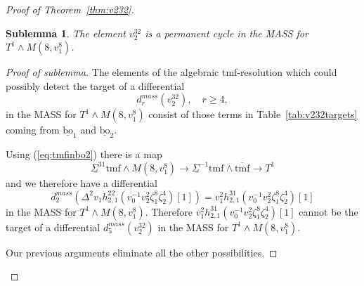 \documentclass[10pt]{amsart}
\newcommand{\ul}[1]{\underline{#1}}
\newcommand{\br}[1]{\overline{#1}}
\newcommand{\tmf}{\mathrm{tmf}}
\newcommand{\bo}{\mathrm{bo}}
\newcommand{\bou}{\ul{\bo}}
\newtheorem{sublem}[equation]{Sublemma}
\theoremstyle{definition}
\numberwithin{equation}{section}
\numberwithin{figure}{section}
\begin{document}
\begin{proof}[Proof of Theorem~\ref{thm:v232}]
\begin{description}
\begin{sublem}\label{sublem:v232T1}
The element $v_2^{32}$ is a permanent cycle in the MASS for $T^1 \wedge M(8,v_1^8)$.
\end{sublem}

\begin{proof}[Proof of sublemma]
The elements of the algebraic tmf-resolution which could possibly detect the target of a differential 
$$ d_r^{mass}(v_2^{32}), \quad r \ge 4, $$
in the MASS for $T^1 \wedge M(8,v_1^8)$ consist of those terms in Table~\ref{tab:v232targets} coming from $\bou_1$ and $\bou_2$.

Using (\ref{eq:tmfinbo2}) there is a map
$$ \Sigma^{31}\tmf \wedge M(8,v_1^8) \rightarrow \Sigma^{-1} \tmf \wedge \br{\tmf} \rightarrow T^1 $$
and we therefore have a differential
$$ d^{mass}_2(\Delta^2 v_1 h_{2,1}^{22}(v_0^{-1}v_2^2\zeta_1^8\zeta_2^4)[1]) = 
v_1^2 h_{2,1}^{31}(v_0^{-1}v_2^2\zeta_1^8\zeta_2^4)[1] $$
in the MASS for $T^1 \wedge M(8,v_1^8)$.
Therefore $v_1^2 h_{2,1}^{31}(v_0^{-1}v_2^2\zeta_1^8\zeta_2^4)[1]$ cannot be the target of a differential $d_5^{mass}(v_2^{32})$ in the MASS for $T^1 \wedge M(8,v_1^8)$.

Our previous arguments eliminate all the other possibilities.
\end{proof}


\end{description}
\end{proof}
\end{document}
